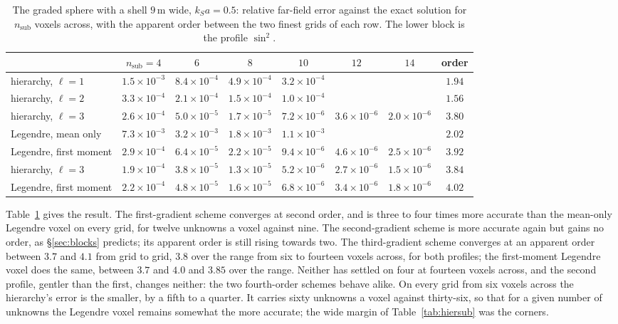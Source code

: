 \documentclass[preprint,review,12pt]{elsarticle}
\begin{document}
\begin{table}[htbp]
\centering
\caption{The graded sphere with a shell $9$\,m wide, $k_Sa=0.5$: relative far-field error against the
exact solution for $n_{\mathrm{sub}}$ voxels across, with the apparent order between the two finest
grids of each row. The lower block is the profile $\sin^2$.}\label{tab:hiergraded}
\small\setlength{\tabcolsep}{4pt}
\begin{tabular}{@{}lccccccc@{}}
\toprule
 & $n_{\mathrm{sub}}=4$ & $6$ & $8$ & $10$ & $12$ & $14$ & order \\
\midrule
hierarchy, $\ell=1$ & $1.5\times10^{-3}$ & $8.4\times10^{-4}$ & $4.9\times10^{-4}$ & $3.2\times10^{-4}$ & & & $1.94$ \\
hierarchy, $\ell=2$ & $3.3\times10^{-4}$ & $2.1\times10^{-4}$ & $1.5\times10^{-4}$ & $1.0\times10^{-4}$ & & & $1.56$ \\
hierarchy, $\ell=3$ & $2.6\times10^{-4}$ & $5.0\times10^{-5}$ & $1.7\times10^{-5}$ & $7.2\times10^{-6}$ & $3.6\times10^{-6}$ & $2.0\times10^{-6}$ & $3.80$ \\
Legendre, mean only & $7.3\times10^{-3}$ & $3.2\times10^{-3}$ & $1.8\times10^{-3}$ & $1.1\times10^{-3}$ & & & $2.02$ \\
Legendre, first moment & $2.9\times10^{-4}$ & $6.4\times10^{-5}$ & $2.2\times10^{-5}$ & $9.4\times10^{-6}$ & $4.6\times10^{-6}$ & $2.5\times10^{-6}$ & $3.92$ \\
\midrule
hierarchy, $\ell=3$ & $1.9\times10^{-4}$ & $3.8\times10^{-5}$ & $1.3\times10^{-5}$ & $5.2\times10^{-6}$ & $2.7\times10^{-6}$ & $1.5\times10^{-6}$ & $3.84$ \\
Legendre, first moment & $2.2\times10^{-4}$ & $4.8\times10^{-5}$ & $1.6\times10^{-5}$ & $6.8\times10^{-6}$ & $3.4\times10^{-6}$ & $1.8\times10^{-6}$ & $4.02$ \\
\bottomrule
\end{tabular}
\end{table}

Table~\ref{tab:hiergraded} gives the result. The first-gradient scheme converges at second order, and
is three to four times more accurate than the mean-only Legendre voxel on every grid, for twelve
unknowns a voxel against nine. The second-gradient scheme is more accurate again but gains no order,
as \S\ref{sec:blocks} predicts; its apparent order is still rising towards two. The third-gradient
scheme converges at an apparent order between $3.7$ and $4.1$ from grid to grid, $3.8$ over the range
from six to fourteen voxels across, for both profiles; the first-moment Legendre voxel does the same,
between $3.7$ and $4.0$ and $3.85$ over the range. Neither has settled on four at fourteen voxels
across, and the second profile, gentler than the first, changes neither: the two fourth-order schemes
behave alike. On every grid from six voxels across the hierarchy's error is the smaller, by a fifth to
a quarter. It carries sixty unknowns a voxel against thirty-six, so that for a given number of unknowns
the Legendre voxel remains somewhat the more accurate; the wide margin of Table~\ref{tab:hiersub} was
the corners.
\end{document}
